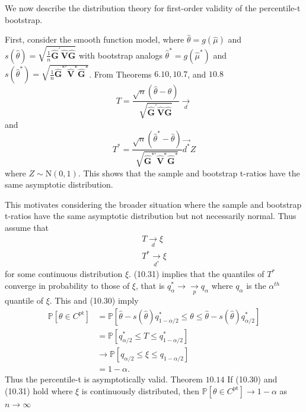 \documentclass[10pt]{article}
\begin{document}
We now describe the distribution theory for first-order validity of the percentile-t bootstrap.

First, consider the smooth function model, where $\widehat{\theta}=g(\widehat{\mu})$ and $s(\widehat{\theta})=\sqrt{\frac{1}{n} \widehat{\boldsymbol{G}}^{\prime} \widehat{\boldsymbol{V}} \widehat{\boldsymbol{G}}}$ with bootstrap analogs $\widehat{\theta}^{*}=g\left(\widehat{\mu}^{*}\right)$ and $s\left(\widehat{\theta}^{*}\right)=\sqrt{\frac{1}{n} \widehat{\boldsymbol{G}}^{* \prime} \widehat{\boldsymbol{V}}^{*} \widehat{\boldsymbol{G}}^{*}}$. From Theorems $6.10,10.7$, and $10.8$
$$
T=\frac{\sqrt{n}(\widehat{\theta}-\theta)}{\sqrt{\widehat{\boldsymbol{G}}^{\prime} \widehat{\boldsymbol{V}} \widehat{\boldsymbol{G}}}} \underset{d}{\longrightarrow}
$$
and
$$
T^{*}=\frac{\sqrt{n}\left(\widehat{\theta}^{*}-\widehat{\theta}\right)}{\sqrt{\widehat{\boldsymbol{G}}^{* \prime} \widehat{\boldsymbol{V}}^{*} \widehat{\boldsymbol{G}}^{*}}} \overrightarrow{d^{*}} Z
$$
where $Z \sim \mathrm{N}(0,1)$. This shows that the sample and bootstrap t-ratios have the same asymptotic distribution.

This motivates considering the broader situation where the sample and bootstrap t-ratios have the same asymptotic distribution but not necessarily normal. Thus assume that
$$
\begin{gathered}
T \underset{d}{\longrightarrow} \xi \\
T^{*} \underset{d^{*}}{\longrightarrow} \xi
\end{gathered}
$$
for some continuous distribution $\xi$. (10.31) implies that the quantiles of $T^{*}$ converge in probability to those of $\xi$, that is $q_{\alpha}^{*} \longrightarrow \underset{p}{\longrightarrow} q_{\alpha}$ where $q_{\alpha}$ is the $\alpha^{t h}$ quantile of $\xi$. This and (10.30) imply
$$
\begin{aligned}
\mathbb{P}\left[\theta \in C^{\mathrm{pt}}\right] &=\mathbb{P}\left[\widehat{\theta}-s(\widehat{\theta}) q_{1-\alpha / 2}^{*} \leq \theta \leq \hat{\theta}-s(\widehat{\theta}) q_{\alpha / 2}^{*}\right] \\
&=\mathbb{P}\left[q_{\alpha / 2}^{*} \leq T \leq q_{1-\alpha / 2}^{*}\right] \\
& \rightarrow \mathbb{P}\left[q_{\alpha / 2} \leq \xi \leq q_{1-\alpha / 2}\right] \\
&=1-\alpha .
\end{aligned}
$$
Thus the percentile-t is asymptotically valid. Theorem $10.14$ If (10.30) and (10.31) hold where $\xi$ is continuously distributed, then $\mathbb{P}\left[\theta \in C^{\mathrm{pt}}\right] \rightarrow 1-\alpha$ as $n \rightarrow \infty$
\end{document}

